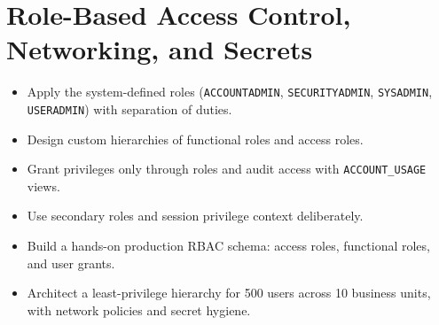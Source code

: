 \chapter{Role-Based Access Control, Networking, and Secrets}
%
\begin{objectives}
\begin{itemize}
    \item Apply the system-defined roles (\texttt{ACCOUNTADMIN}, \texttt{SECURITYADMIN}, \texttt{SYSADMIN}, \texttt{USERADMIN}) with separation of duties.
    \item Design custom hierarchies of functional roles and access roles.
    \item Grant privileges only through roles and audit access with \texttt{ACCOUNT\_USAGE} views.
    \item Use secondary roles and session privilege context deliberately.
    \item Build a hands-on production RBAC schema: access roles, functional roles, and user grants.
    \item Architect a least-privilege hierarchy for 500 users across 10 business units, with network policies and secret hygiene.
\end{itemize}
\end{objectives}

